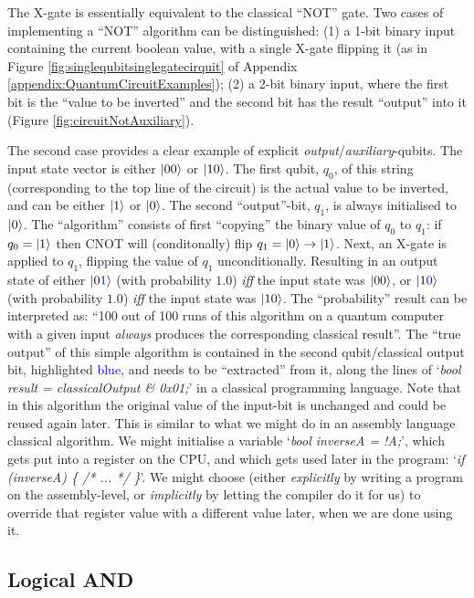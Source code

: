 \documentclass[conference]{IEEEtran}
\begin{document}
The X-gate is essentially equivalent to the classical ``NOT'' gate.
Two cases of implementing a ``NOT'' algorithm can be distinguished:
(1) a 1-bit binary input containing the current boolean value, with a single X-gate flipping it
(as in Figure \ref{fig:singlequbitsinglegatecirquit} of Appendix \ref{appendix:QuantumCircuitExamples});
(2) a 2-bit binary input, where the first bit is the
``value to be inverted'' and the second bit has the result ``output'' into it (Figure \ref{fig:circuitNotAuxiliary}).

The second case provides a clear example of explicit \textit{output}/\textit{auxiliary}-qubits.
The input state vector is either $\ket{00}$ or $\ket{10}$.
The first qubit, $q_0$, of this string (corresponding to the top line of the circuit) is the actual value to be inverted,
and can be either $\ket{1}$ or $\ket{0}$. The second ``output''-bit, $q_1$, is always initialised to $\ket{0}$.
The ``algorithm'' consists of first ``copying'' the binary value of $q_0$ to $q_1$:
if $q_0 = \ket{1}$ then CNOT will (conditonally) flip $q_1 = \ket{0} \rightarrow \ket{1}$. Next, an X-gate is applied to $q_1$, flipping the value of $q_1$ unconditionally.
Resulting in an output state of either $\ket{0\textcolor{blue}{1}}$ (with probability $1.0$) \textit{iff} the input state was $\ket{00}$,
or $\ket{1\textcolor{blue}{0}}$ (with probability $1.0$) \textit{iff} the input state was $\ket{10}$.
The ``probability'' result can be interpreted as: ``100 out of 100 runs of this algorithm on a quantum computer with a given
input \textit{always} produces the corresponding classical result''.
The ``true output'' of this simple algorithm is contained in the second qubit/classical output bit,
highlighted \textcolor{blue}{blue}, and needs to be ``extracted'' from it,
along the lines of `\textit{bool result = classicalOutput \& 0x01;}' in a classical programming language.
Note that in this algorithm the original value of the input-bit is unchanged and could be reused again later.
This is similar to what we might do in an assembly language classical algorithm.
We might initialise a variable `\textit{bool inverseA = !A;}', which gets put into a register on the CPU,
and which gets used later in the program: `\textit{if (inverseA) \{ /* ... */ \}}'.
We might choose (either \textit{explicitly} by writing a program on the assembly-level, or \textit{implicitly}
by letting the compiler do it for us)
to override that register value with a different value later, when we are done using it.

\subsection{Logical AND}
\end{document}
